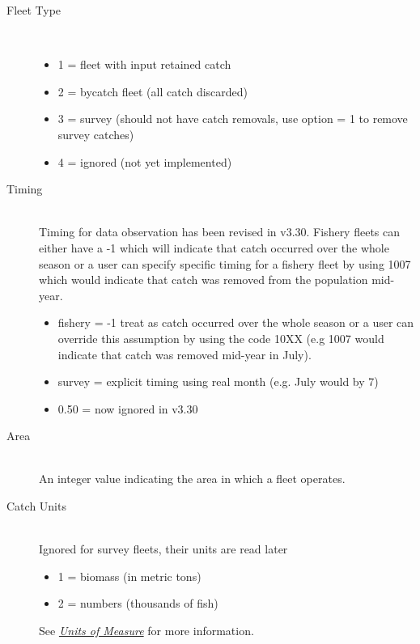 \begin{description}
  \item[Fleet Type] \ 
	  \begin{itemize}
	  	\item 1 = fleet with input retained catch
	  	\item 2 = bycatch fleet (all catch discarded)
	  	\item 3 = survey (should not have catch removals, use option = 1 to remove survey catches)
	  	\item 4 = ignored (not yet implemented)
	  \end{itemize}

 \hypertarget{ObsTiming}{}
  \item[Timing]\hfill\\
   Timing for data observation has been revised in v3.30.  Fishery fleets can either have a -1 which will indicate that catch occurred over the whole season or a user can specify specific timing for a fishery fleet by using 1007 which would indicate that catch was removed from the population mid-year. %
	  \begin{itemize}
	  	\item fishery = -1 treat as catch occurred over the whole season or a user can override this assumption by using the code 10XX (e.g 1007 would indicate that catch was removed mid-year in July).
	  	\item survey = explicit timing using real month (e.g. July would by 7)
	  	\item 0.50 = now ignored in v3.30
	  \end{itemize}
  \item[Area]\hfill\\
  An integer value indicating the area in which a fleet operates.
  \item[Catch Units] \hfill\\
  Ignored for survey fleets, their units are read later
	  \begin{itemize}
	  	\item 1 = biomass (in metric tons)
	  	\item 2 = numbers (thousands of fish)
	  \end{itemize}   
  See \hyperlink{UnitsOfMeasure}{\textit{Units of Measure}} for more information.
 

\end{description}
